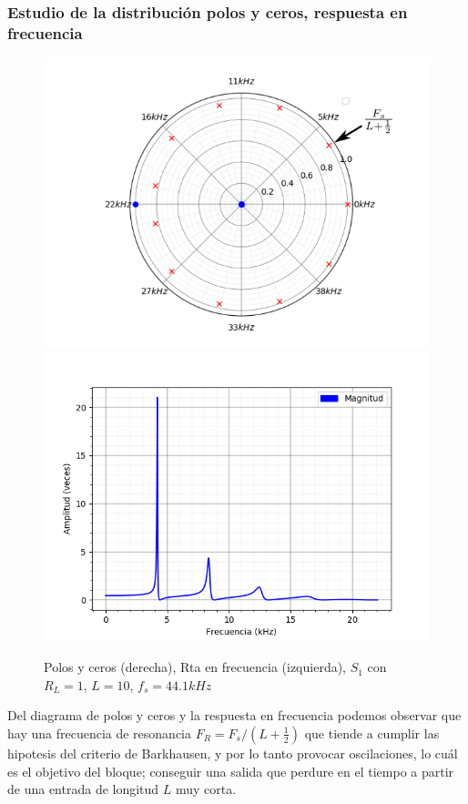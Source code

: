 \documentclass[assd_tp2_main.tex]{subfiles}
\begin{document}
\subsubsection{Estudio de la distribución polos y ceros, respuesta en frecuencia}
\begin{figure}[H]	
	\includegraphics[scale=0.45]{graficos/polos.png}
	\includegraphics[scale=0.58]{graficos/freq_response.png}
	\caption{Polos y ceros (derecha), Rta en frecuencia (izquierda), $S_1$ con $R_L=1$, $L=10$, $f_s=44.1kHz$}
	\label{fig:polosCeros}
\end{figure}

Del diagrama de polos y ceros y la respuesta en frecuencia podemos observar que hay una frecuencia de resonancia $F_R=F_s/(L+\frac{1}{2})$ que tiende a cumplir las hipotesis del criterio de Barkhausen, y por lo tanto provocar oscilaciones, lo cuál es el objetivo del bloque; conseguir una salida que perdure en el tiempo a partir de una entrada de longitud $L$ muy corta.
\end{document}
